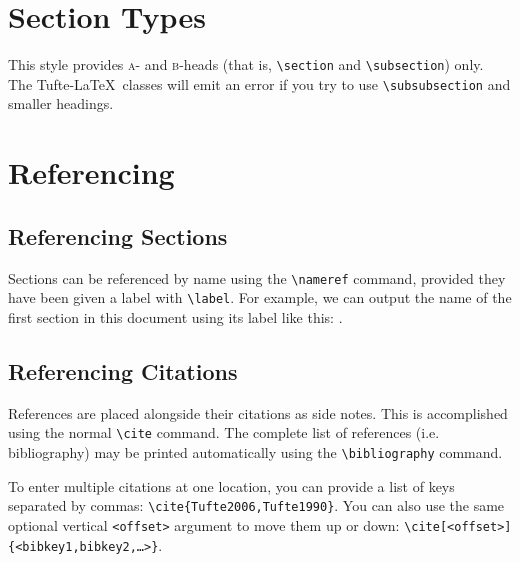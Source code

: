\documentclass[letter]{tufte-handout} %
\begin{document}

\section{Section Types}\label{sec:sectiontypes}

This style provides \textsc{a}- and \textsc{b}-heads (that is, \texttt{\textbackslash section} and \texttt{\textbackslash subsection}) only. The Tufte-\LaTeX\ classes will emit an error if you try to use \texttt{\textbackslash subsubsection} and smaller headings.


\section{Referencing}\label{sec:referencing}

\subsection{Referencing Sections}

Sections can be referenced by name using the \texttt{\textbackslash nameref} command, provided they have been given a label with \texttt{\textbackslash label}. For example, we can output the name of the first section in this document using its label like this: .

\subsection{Referencing Citations}

References are placed alongside their citations as side notes\cite{Tufte1997}. This is accomplished using the normal \texttt{\textbackslash cite} command. The complete list of references (i.e. bibliography) may be printed automatically using the \texttt{\textbackslash bibliography} command.

To enter multiple citations at one location\cite{Tufte2006,Tufte1990}, you can provide a list of keys separated by commas: \texttt{\textbackslash cite\{Tufte2006,Tufte1990\}}. You can also use the same optional vertical \texttt{<offset>} argument to move them up or down: \texttt{\textbackslash cite[<offset>]\{<bibkey1,bibkey2,\ldots>\}}.
\end{document}
